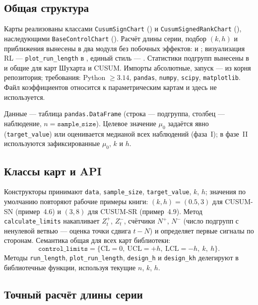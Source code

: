 \documentclass[11pt,a4paper]{article}
\begin{document}
\subsection{Общая структура}
\label{sec:impl-struct}

Карты реализованы классами \texttt{CusumSignChart}
() и
\texttt{CusumSignedRankChart}
(),
наследующими \texttt{BaseControlChart}
(). Расчёт длины серии,
подбор $(k,h)$ и приближения вынесены в два модуля без побочных эффектов:
 и ;
визуализация RL --- \texttt{plot\_run\_length} в
, единый стиль --- .
Статистики подгрупп вынесены в  и общие для карт
Шухарта и CUSUM. Импорты абсолютные, запуск --- из корня репозитория;
требования: Python $\ge 3.14$, \texttt{pandas}, \texttt{numpy},
\texttt{scipy}, \texttt{matplotlib}. Файл коэффициентов относится к
параметрическим картам и здесь не используется.

Данные --- таблица \texttt{pandas.DataFrame} (строка --- подгруппа,
столбец --- наблюдение, $n = \texttt{sample\_size}$). Целевое значение
$\mu_0$ задаётся явно (\texttt{target\_value}) или оценивается медианой
всех наблюдений (фаза~I); в фазе~II используются зафиксированные
$\mu_0$, $k$ и $h$.

\subsection{Классы карт и API}
\label{sec:impl-classes}

Конструкторы принимают \texttt{data}, \texttt{sample\_size},
\texttt{target\_value}, $k$, $h$; значения по умолчанию повторяют рабочие
примеры книги: $(k,h)=(0.5,3)$ для CUSUM-SN (пример~4.6) и $(3,8)$ для
CUSUM-SR (пример~4.9). Метод \texttt{calculate\_limits} накапливает
$Z_t^+$, $Z_t^-$, счётчики $N^+$, $N^-$ (число подгрупп с ненулевой
ветвью --- оценка точки сдвига $t-N$) и определяет первые сигналы по
сторонам. Семантика общая для всех карт библиотеки:
\[
\texttt{control\_limits} = \{\mathrm{CL}=0,\ \mathrm{UCL}=+h,\
\mathrm{LCL}=-h,\ k,\ h\}.
\]
Методы \texttt{run\_length}, \texttt{plot\_run\_length},
\texttt{design\_h} и \texttt{design\_kh} делегируют в библиотечные
функции, используя текущие $n$, $k$, $h$.

\subsection{Точный расчёт длины серии}
\label{sec:impl-rl}
\end{document}
